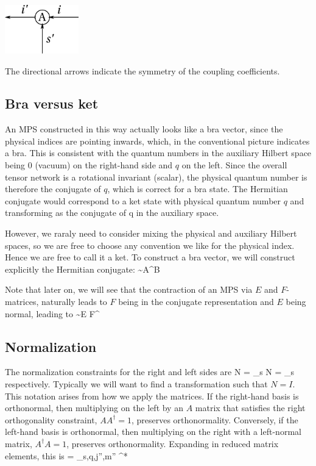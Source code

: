 \documentclass{article}[10pt]
\begin{document}
\begin{centering}
\includegraphics[width=32mm]{AMat.pdf}\par
\end{centering}

The directional arrows indicate the symmetry of the coupling coefficients.

\subsection{Bra versus ket}

An MPS constructed in this way actually looks like a bra vector, since the physical indices
are pointing inwards, which, in the conventional picture indicates a bra. This is consistent with
the quantum numbers in the auxiliary Hilbert space being 0 (vacuum) on the right-hand side
and $q$ on the left. Since the overall tensor network is a rotational invariant (scalar), the
physical quantum number is therefore the conjugate of $q$, which is correct for a bra state. The
Hermitian conjugate would correspond to a ket state with physical quantum number $q$ and
transforming as the conjugate of q in the auxiliary space.

However, we raraly need to consider mixing the physical and auxiliary Hilbert spaces, so we are free
to choose any convention we like for the physical index. Hence we are free to call it a ket.
To construct a bra vector, we will construct explicitly the Hermitian conjugate:
\beq
{} \sim A^\dagger B
\eeq

Note that later on, we will see that the contraction of an MPS via $E$ and $F$-matrices, naturally leads to
$F$ being in the conjugate representation and $E$ being normal, leading to
\beq
{} \sim E F^\dagger
\eeq

\subsection{Normalization}
\label{sec:AMatNormalization}

The normalization constraints for the right and left sides are
\beq
N = \sum_s  
\label{eq:staterightnorm}
\eeq
\beq
N = \sum_s  
\eeq
respectively. Typically we will want to find a transformation such
that $N = I$.
This notation arises from how we apply the matrices. If the right-hand basis
is orthonormal, then multiplying on the left by an $A$ matrix that satisfies the right orthogonality
constraint, $AA^\dagger = 1$, preserves orthonormality.  Conversely, if the left-hand basis
is orthonormal, then multiplying on the right with a left-normal matrix, $A^\dagger A = 1$, 
preserves orthonormality.
Expanding  in reduced matrix elements, this is
\beq
{} = 
\sum_{s,q,j'',m''} 
^*
\eeq
\end{document}
